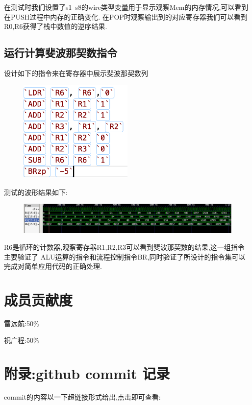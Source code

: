 \documentclass{article}
\begin{document}
在测试时我们设置了s1~s8的wire类型变量用于显示观察Mem的内存情况,可以看到在PUSH过程中内存的正确变化.
在POP时观察输出到的对应寄存器我们可以看到R0,R6获得了栈中数值的逆序结果.

\subsection{运行计算斐波那契数指令}
设计如下的指令来在寄存器中展示斐波那契数列
\begin{figure}[H]
    \centering
    \includegraphics[width=0.5\textwidth]{1.png}
   
    \end{figure}

测试的波形结果如下:
\begin{figure}[H]
    \centering
    \includegraphics[width=1\textwidth]{2.png}
   
    \end{figure}

R6是循环的计数器,观察寄存器R1,R2,R3可以看到斐波那契数的结果,这一组指令主要验证了
ALU运算的指令和流程控制指令BR,同时验证了所设计的指令集可以完成对简单应用代码的正确处理.


\section{成员贡献度}
雷远航:50$\%$

祝广程:50$\%$


\section{附录:github commit 记录}
commit的内容以一下超链接形式给出,点击即可查看:
\end{document}
